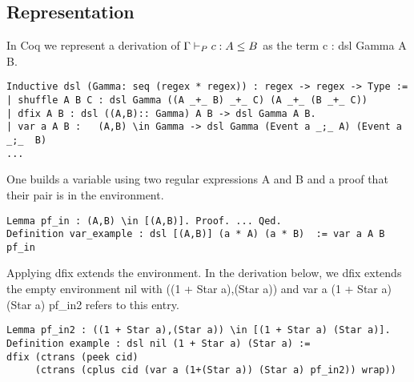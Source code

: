 \documentclass[a4paper,UKenglish,cleveref, autoref, thm-restate]{lipics-v2021}
\newcommand\mycomment[1]{}
\begin{document}
\subsection{Representation}
In Coq we represent a derivation of $\containsG{c}{A}{B}$ as the term  \textsf{c : dsl Gamma A B}.
\mycomment{change drop to peek in code}
\begin{verbatim}
Inductive dsl (Gamma: seq (regex * regex)) : regex -> regex -> Type := 
| shuffle A B C : dsl Gamma ((A _+_ B) _+_ C) (A _+_ (B _+_ C))
| dfix A B : dsl ((A,B):: Gamma) A B -> dsl Gamma A B.
| var a A B :   (A,B) \in Gamma -> dsl Gamma (Event a _;_ A) (Event a _;_  B) 
...
\end{verbatim}
One builds a variable using two regular expressions \textsf{A} and \textsf{B} and a proof that their pair is in the environment. 
\begin{verbatim}
Lemma pf_in : (A,B) \in [(A,B)]. Proof. ... Qed.
Definition var_example : dsl [(A,B)] (a * A) (a * B)  := var a A B pf_in
\end{verbatim}
Applying \textsf{dfix} extends the environment. In the derivation below, we \textsf{dfix} extends the empty environment \textsf{nil} with \textsf{((1 + Star a),(Star a))} and \textsf{var a (1 + Star a) (Star a) pf\_in2} refers to this entry.
\begin{verbatim}
Lemma pf_in2 : ((1 + Star a),(Star a)) \in [(1 + Star a) (Star a)].
Definition example : dsl nil (1 + Star a) (Star a) := 
dfix (ctrans (peek cid)
     (ctrans (cplus cid (var a (1+(Star a)) (Star a) pf_in2)) wrap))
\end{verbatim}




\newcommand{\dentry}[2]{\begin{tabular}{l} #1 \\ #2 \end{tabular}}
\newcommand{\tabline}[6]{#1 & #2 & #3 & #4 & #5 & #6}
\end{document}
